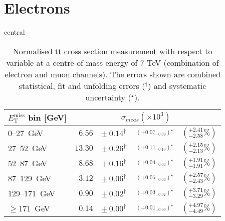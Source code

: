 \documentclass{article}
\newcommand{\ttbar}{\ensuremath{\text{t}\bar{\text{t}}}\xspace}
\newcommand{\GeV}{GeV}
\begin{document}
\section{Electrons}

central
\begin{table}[htbp]
\setlength{\tabcolsep}{2pt}
\centering
\caption{Normalised \ttbar cross section measurement with respect to \MET variable
at a centre-of-mass energy of 7 TeV (combination of electron and muon channels). The errors shown are combined statistical, fit and unfolding errors ($^\dagger$) and systematic uncertainty ($^\star$).}
\label{tab:MET_xsections_7TeV_central_combined}
\begin{tabular}{lrrrr}
\hline
$E_{\mathrm{T}}^{\mathrm{miss}}$ bin [\GeV] & \multicolumn{4}{c}{$\sigma_{meas} \left(\times 10^{3}\right)$}\\ 
\hline
0--27~\GeV &  $6.56$ & $ \pm~ 0.14^\dagger$ & $ ~^({+0.07}_{-0.09})^\star$ & $(^{+2.41}_{-2.58}\%)$\\
27--52~\GeV &  $13.30$ & $ \pm~ 0.26^\dagger$ & $ ~^({+0.11}_{-0.10})^\star$ & $(^{+2.15}_{-2.13}\%)$\\
52--87~\GeV &  $8.68$ & $ \pm~ 0.16^\dagger$ & $ ~^({+0.04}_{-0.04})^\star$ & $(^{+1.91}_{-1.91}\%)$\\
87--129~\GeV &  $3.12$ & $ \pm~ 0.06^\dagger$ & $ ~^({+0.05}_{-0.04})^\star$ & $(^{+2.57}_{-2.43}\%)$\\
129--171~\GeV &  $0.90$ & $ \pm~ 0.02^\dagger$ & $ ~^({+0.03}_{-0.02})^\star$ & $(^{+3.71}_{-3.29}\%)$\\
$\geq 171$~\GeV &  $0.14$ & $ \pm~ 0.00^\dagger$ & $ ~^({+0.01}_{-0.00})^\star$ & $(^{+4.97}_{-4.49}\%)$\\
\hline 
\end{tabular}
\end{table}
\end{document}
